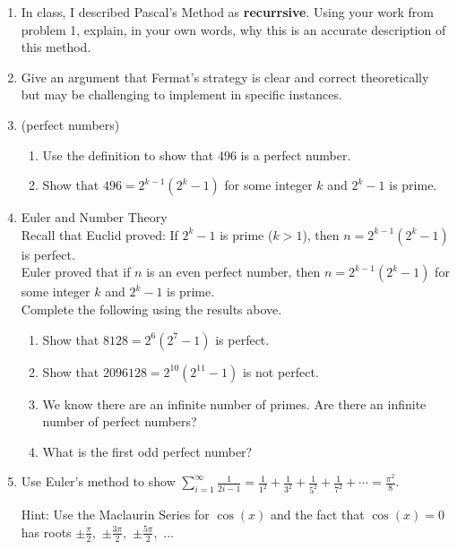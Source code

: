 \documentclass[12pt]{article}
\renewcommand{\emph}[1]{\textsf{\textbf{#1}}}
\begin{document}
\begin{enumerate}
\item In class, I described Pascal's Method as \emph{recurrsive}. Using your work from problem 1, explain, in your own words, why this is an accurate description of this method.
\item Give an argument that Fermat's strategy is clear and correct theoretically but may be challenging to implement in specific instances.
\item (perfect numbers) 
	\begin{enumerate}
	\item Use the definition to show that 496 is a perfect number.
	\item Show that $496=2^{k-1}(2^k-1)$ for some integer $k$ and $2^k-1$ is prime.
	\end{enumerate}
\item Euler and Number Theory\\
Recall that Euclid proved: If $2^k-1$ is prime ($k>1$), then $n=2^{k-1}(2^k-1)$ is perfect.\\
Euler proved that if $n$ is an even perfect number, then $n=2^{k-1}(2^k-1)$ for some integer $k$ and $2^k-1$ is prime. \\
Complete the following using the results above.
	\begin{enumerate}
	\item Show that $8128=2^{6}(2^{7}-1)$ is perfect.
	\item Show that $2096128=2^{10}(2^{11}-1)$ is not perfect.
	\item We know there are an infinite number of primes. Are there an infinite number of perfect numbers?
	\item What is the first odd perfect number?
	\end{enumerate}
\item Use Euler's method to show $\displaystyle{\sum_{i=1}^\infty \frac{1}{2i-1}= \frac{1}{1^2}+\frac{1}{3^2}+\frac{1}{5^2}+\frac{1}{7^2}+\cdots= \frac{\pi^2}{8}.}$

Hint: Use the Maclaurin Series for $\cos(x)$ and the fact that $\cos(x)=0$ has roots $\pm\frac{\pi}{2},$ $\pm\frac{3\pi}{2},$ $\pm\frac{5\pi}{2},$ ...\end{enumerate}
\end{document}
